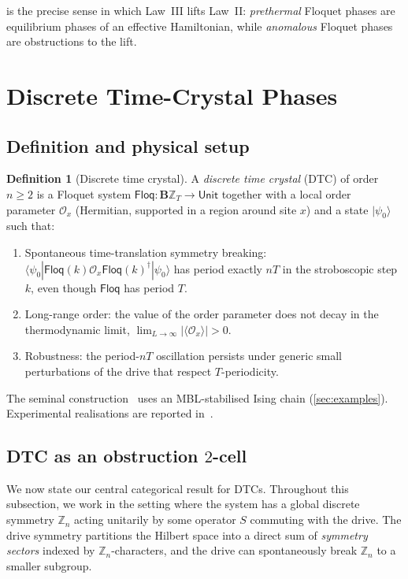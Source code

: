 \documentclass[12pt]{article}
\theoremstyle{definition}
\newtheorem{definition}[theorem]{Definition}
\theoremstyle{remark}
\newcommand{\Z}{\mathbb{Z}}
\newcommand{\Floq}{\mathsf{Floq}}
\begin{document}
 is the precise sense in which Law~III lifts Law~II: \emph{prethermal} Floquet phases are equilibrium phases of an effective Hamiltonian, while \emph{anomalous} Floquet phases are obstructions to the lift.

\section{Discrete Time-Crystal Phases}
\label{sec:dtc}

\subsection{Definition and physical setup}

\begin{definition}[Discrete time crystal]
\label{def:dtc}
A \emph{discrete time crystal} (DTC) of order $n\geq 2$ is a Floquet system $\Floq\colon\mathbf{B}\Z_T\to\mathsf{Unit}$ together with a local order parameter $\mathcal{O}_x$ (Hermitian, supported in a region around site $x$) and a state $|\psi_0\rangle$ such that:
\begin{enumerate}
\item Spontaneous time-translation symmetry breaking: $\langle\psi_0|\Floq(k)\mathcal{O}_x\Floq(k)^\dagger|\psi_0\rangle$ has period exactly $nT$ in the stroboscopic step $k$, even though $\Floq$ has period $T$.
\item Long-range order: the value of the order parameter does not decay in the thermodynamic limit, $\lim_{L\to\infty}|\langle\mathcal{O}_x\rangle|>0$.
\item Robustness: the period-$nT$ oscillation persists under generic small perturbations of the drive that respect $T$-periodicity.
\end{enumerate}
\end{definition}

The seminal construction~\cite{else2016} uses an MBL-stabilised Ising chain (\cref{sec:examples}). Experimental realisations are reported in~\cite{zhang2017,choi2017}.

\subsection{DTC as an obstruction \texorpdfstring{$2$}{2}-cell}

We now state our central categorical result for DTCs. Throughout this subsection, we work in the setting where the system has a global discrete symmetry $\Z_n$ acting unitarily by some operator $S$ commuting with the drive. The drive symmetry partitions the Hilbert space into a direct sum of \emph{symmetry sectors} indexed by $\Z_n$-characters, and the drive can spontaneously break $\Z_n$ to a smaller subgroup.
\end{document}
